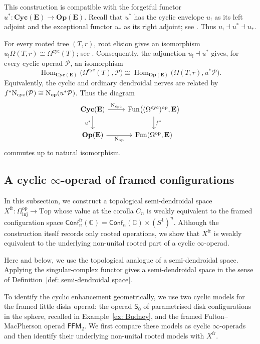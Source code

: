 \documentclass{amsart}
\newcommand{\bE}{\mathbf{E}}
\newcommand{\Top}{\mathrm{Top}}
\newcommand{\Cyc}{\mathbf{Cyc}}
\newcommand{\Op}{\mathbf{Op}}
\newcommand{\Hom}{\operatorname{Hom}}
\newcommand{\nerve}{\textnormal{N}}
\newcommand{\Conf}{\mathsf{Conf}}%
\theoremstyle{definition}
\numberwithin{equation}{section}
\begin{document}
This construction is compatible with the forgetful functor
$u^*\colon\Cyc(\bE)\to\Op(\bE)$. Recall that $u^*$ has the cyclic
envelope $u_!$ as its left adjoint and the exceptional functor $u_*$
as its right adjoint; see \cite[Section~3]{DCH}. Thus
$u_!\dashv u^*\dashv u_*$.

For every rooted tree $(T,r)$, root elision gives an isomorphism
$u_!\Omega(T,r)\cong\Omega^{\mathrm{cyc}}(T)$; see
\cite[Definition~4.11 and the following discussion]
{doherty2025models}. Consequently, the adjunction
$u_!\dashv u^*$ gives, for every cyclic operad $\mathcal P$, an
isomorphism
\[
\Hom_{\Cyc(\bE)}
\bigl(\Omega^{\mathrm{cyc}}(T),\mathcal P\bigr)
\cong
\Hom_{\Op(\bE)}
\bigl(\Omega(T,r),u^*\mathcal P\bigr).
\]
Equivalently, the cyclic and ordinary dendroidal nerves are related
by
$f^*\nerve_{\mathrm{cyc}}(\mathcal P)
\cong\nerve_{\mathrm{op}}(u^*\mathcal P)$.
Thus the diagram
\[
\begin{tikzcd}
\Cyc(\bE)
    \arrow[r,"\nerve_{\mathrm{cyc}}"]
    \arrow[d,"u^*"']
&
\operatorname{Fun}
\bigl((\Omega^{\mathrm{cyc}})^{\mathrm{op}},\bE\bigr)
    \arrow[d,"f^*"]
\\
\Op(\bE)
    \arrow[r,"\nerve_{\mathrm{op}}"']
&
\operatorname{Fun}(\Omega^{\mathrm{op}},\bE)
\end{tikzcd}
\]
commutes up to natural isomorphism.


\subsection{A cyclic \texorpdfstring{$\infty$}{infinity}-operad of
framed configurations}
\label{subsec:framed_conf_operad}

In this subsection, we construct a topological semi-dendroidal space
$X^{\mathrm{fr}}\colon\Omega_{\mathrm{inj}}^{\mathrm{op}}\to\Top$
whose value at the corolla $C_n$ is weakly equivalent to the framed
configuration space
$\Conf_n^{\mathrm{fr}}(\mathbb C)
=\Conf_n(\mathbb C)\times(S^1)^n$.
Although the construction itself records only rooted operations, we
show that $X^{\mathrm{fr}}$ is weakly equivalent to the underlying
non-unital rooted part of a cyclic $\infty$-operad.

Here and below, we use the topological analogue of a semi-dendroidal
space. Applying the singular-complex functor gives a semi-dendroidal
space in the sense of Definition~\ref{def: semi-dendroidal space}.

To identify the cyclic enhancement geometrically, we use two cyclic
models for the framed little disks operad: the operad $\mathsf S_0$
of parametrised disk configurations in the sphere, recalled in
Example~\ref{ex: Budney}, and the framed Fulton--MacPherson operad
$\mathsf{FFM}_2$. We first compare these models as cyclic
$\infty$-operads and then identify their underlying non-unital rooted
models with $X^{\mathrm{fr}}$.
\end{document}
